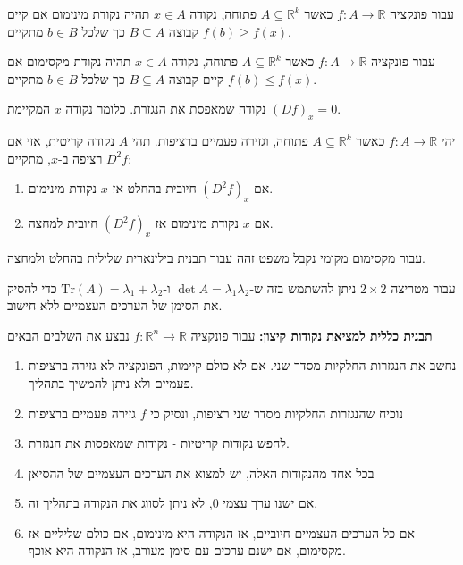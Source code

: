 \documentclass{tstextbook}
\begin{document}
\begin{definition}
עבור פונקציה \(f:A\to\mathbb{R}\) כאשר \(A\subseteq \mathbb{R}^k\) פתוחה, נקודה \(x \in A\) תהיה נקודת מינימום אם קיים קבוצה \(B\subseteq A\) כך שלכל \(b\in B\) מתקיים \(f(b)\geq f(x)\).

\end{definition}
\begin{definition}
עבור פונקציה \(f:A\to\mathbb{R}\) כאשר \(A\subseteq \mathbb{R}^k\) פתוחה, נקודה \(x \in A\) תהיה נקודת מקסימום אם קיים קבוצה \(B\subseteq A\) כך שלכל \(b\in B\) מתקיים \(f(b)\leq f(x)\).

\end{definition}
\begin{definition}
נקודה שמאפסת את הנגזרת. כלומר נקודה \(x\) המקיימת \((Df)_{x}=0\).

\end{definition}
\begin{theorem}
יהי \(f:A\to \mathbb{R}\) כאשר \(A\subseteq \mathbb{R}^k\) פתוחה, וגזירה פעמיים ברציפות. תהי \(A\) נקודה קריטית, אזי אם \(D^2f\) רציפה ב-\(x\), מתקיים:

  \begin{enumerate}
    \item אם \((D^2f)_{x}\) חיובית בהחלט אז \(x\) נקודת מינימום. 


    \item אם \(x\) נקודת מינימום אז \((D^2f)_{x}\) חיובית למחצה. 


  \end{enumerate}
\end{theorem}
עבור מקסימום מקומי נקבל משפט זהה עבור תבנית בילינארית שלילית בהחלט ולמחצה.

עבור מטריצה \(2\times 2\) ניתן להשתמש בזה ש-\(\det A=\lambda_{1}\lambda_{2}\) ו-\(\mathrm{Tr}(A)=\lambda_{1}+\lambda_{2}\) כדי להסיק את הסימן של הערכים העצמיים ללא חישוב.

\textbf{תבנית כללית למציאת נקודות קיצון:}
עבור פונקציה \(f:\mathbb{R}^n\to\mathbb{R}\) נבצע את השלבים הבאים

\begin{enumerate}
  \item נחשב את הנגזרות החלקיות מסדר שני. אם לא כולם קיימות, הפונקציה לא גזירה ברציפות פעמיים ולא ניתן להמשיך בתהליך. 


  \item נוכיח שהנגזרות החלקיות מסדר שני רציפות, ונסיק כי \(f\) גזירה פעמיים ברציפות 


  \item לחפש נקודות קריטיות - נקודות שמאפסות את הנגזרת. 


  \item בכל אחד מהנקודות האלה, יש למצוא את הערכים העצמיים של ההסיאן 


  \item אם ישנו ערך עצמי 0, לא ניתן לסווג את הנקודה בתהליך זה. 


  \item אם כל הערכים העצמיים חיוביים, אז הנקודה היא מינימום, אם כולם שליליים אז מקסימום, אם ישנם ערכים עם סימן מעורב, אז הנקודה היא אוכף. 


\end{enumerate}
\end{document}
